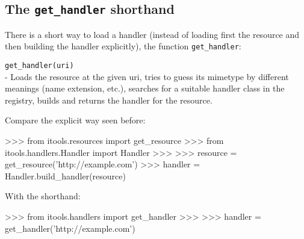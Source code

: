 \subsection{The {\tt get\_handler} shorthand}

There is a short way to load a handler (instead of loading first the resource
and then building the handler explicitly), the function {\tt get\_handler}:

\begin{api}
  {\tt get\_handler(uri)}\\
  - Loads the resource at the given uri, tries to guess its mimetype by
  different meanings (name extension, etc.), searches for a suitable
  handler class in the registry, builds and returns the handler for
  the resource.
\end{api}

Compare the explicit way seen before:

\begin{code}
    >>> from itools.resources import get_resource
    >>> from itools.handlers.Handler import Handler
    >>>
    >>> resource = get_resource('http://example.com')
    >>> handler = Handler.build_handler(resource)
\end{code}

With the shorthand:

\begin{code}
    >>> from itools.handlers import get_handler
    >>>
    >>> handler = get_handler('http://example.com')
\end{code}